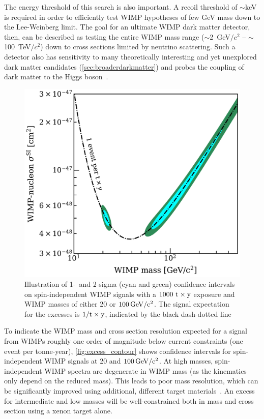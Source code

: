 The energy threshold of this search is also important. A recoil threshold of $\sim$keV is required in order to efficiently test WIMP hypotheses of few GeV mass down to the Lee-Weinberg limit. The goal for an ultimate WIMP dark matter detector, then, can be described as testing the entire WIMP mass range ($\sim$2~GeV$/c^2$ -- $\sim$100~TeV$/c^2$) down to cross sections limited by neutrino scattering. Such a detector also has sensitivity to many theoretically interesting and yet unexplored dark matter candidates (\autoref{sec:broaderdarkmatter}) and probes the coupling of dark matter to the Higgs boson~\cite{Feng:2014vea}.

\begin{figure}[!htbp] 
	\centering
    \includegraphics[width=\columnwidth]{fig_simplified_contour_si.pdf}
    \caption{Illustration of 1-~and 2-sigma (cyan and green) confidence intervals on spin-independent WIMP signals with a $1000~\mathrm{t}\times\mathrm{y}$ exposure and WIMP masses of either 20 or $100\, \mathrm{GeV/c^2}$. The signal expectation for the excesses is $1/\mathrm{t}\times\mathrm{y}$, indicated by the black dash-dotted line}
\label{fig:excess_contour}
\end{figure}

To indicate the WIMP mass and cross section resolution expected for a signal from WIMPs roughly one order of magnitude below current constraints (one event per tonne-year), \autoref{fig:excess_contour} shows confidence intervals for spin-independent WIMP signals at 20 and $100\, \mathrm{GeV/c^2}$. At high masses, spin-independent WIMP spectra are degenerate in WIMP mass (as the kinematics only depend on the reduced mass). This leads to poor mass resolution, which can be significantly improved using additional, different target materials~\cite{Pato:2010zk}. An excess for intermediate and low masses will be well-constrained both in mass and cross section using a xenon target alone.

